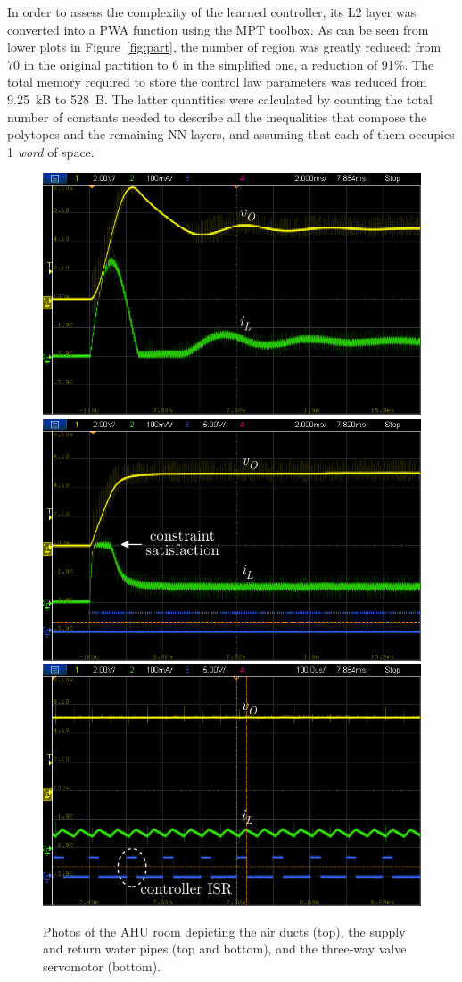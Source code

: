In order to assess the complexity of the learned controller, its L2 layer was converted into a PWA function using the MPT toolbox. As can be seen from lower plots in Figure~\ref{fig:part}, the number of region was greatly reduced: from 70 in the original partition to 6 in the simplified one, a reduction of 91\%. The total memory required to store the control law parameters was reduced from 9.25~kB to 528~B. The latter quantities were calculated by counting the total number of constants needed to describe all the inequalities that compose the polytopes and the remaining NN layers, and assuming that each of them occupies 1 \textit{word} of space.

\clearpage

\begin{figure}
	\centering
	\includegraphics[width=0.65\linewidth]{../images/chap4_scope_ol} \\[5pt]
	\includegraphics[width=0.65\linewidth]{../images/chap4_scope_cl1} \\[5pt]
	\includegraphics[width=0.65\linewidth]{../images/chap4_scope_cl2}
	\caption{Photos of the AHU room depicting the air ducts (top), the supply and return water pipes (top and bottom), and the three-way valve servomotor (bottom).}
	\label{fig.asd}
\end{figure}

\clearpage